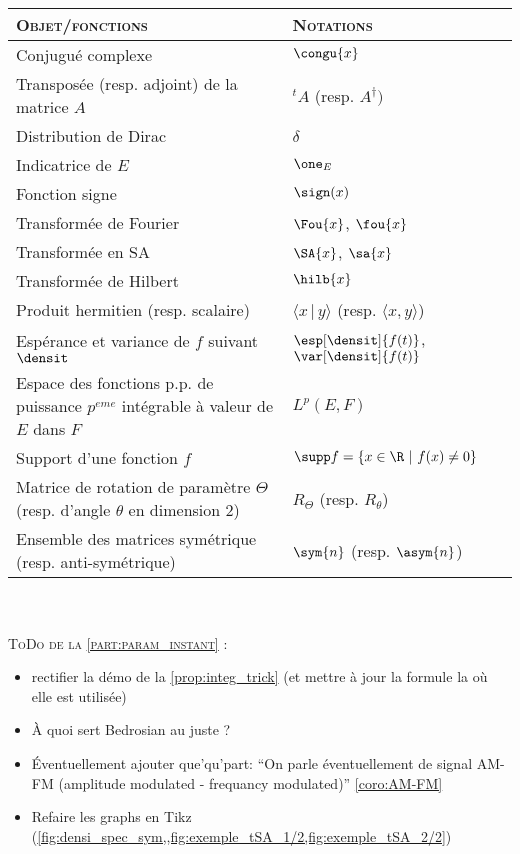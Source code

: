 \begin{tabular}{|| l | l ||} \hline
	\textsc{Objet/fonctions}  & \textsc{Notations} \\
	\hline\hline
	Conjugué complexe  					 &  $\congu{x}$ \\ \hline
	Transposée (resp. adjoint) de la matrice $A$ & $^tA$ (resp. $A^\dagger)$ \\ \hline
	Distribution de Dirac   &  $\delta$\\ \hline 
	Indicatrice de $E$   	 &  $\one_E$ \\ \hline 
	Fonction signe   		    &  $\sign(x)$ \\ \hline
	Transformée de Fourier   						&  $\Fou{x}$, $\fou{x}$ \\ \hline
	Transformée en SA   		  &  $\SA{x}$, $\sa{x}$ \\ \hline
	Transformée de Hilbert   	&  $\hilb{x}$ \\ \hline
	Produit hermitien (resp. scalaire)   &  $\langle x \,|\, y\rangle$ (resp. $\langle x,y\rangle$) \\ \hline
	Espérance et variance de $f$ suivant $\densit$   &  $\esp[\densit]{f(t)}$, $\var[\densit]{f(t)}$ \\  \hline
	Espace des fonctions p.p. de puissance $p^{eme}$ intégrable à valeur de $E$ dans $F$  &  $L^p(E, F)$ \\  \hline		
	Support d'une fonction $f$   &  $\supp f =\{x\in\R\ |\ f(x)\neq0\}$ \\  \hline
	Matrice de rotation de paramètre $\Theta$ (resp. d'angle $\theta$ en dimension 2)  &  $R_\Theta$ (resp. $R_\theta$)  \\  \hline
	Ensemble des matrices symétrique (resp. anti-symétrique)  &  $\sym{n}$ (resp. $\asym{n}$) \\  \hline	
\end{tabular}
\\ \\

\textsc{ToDo de  la \cref{part:param_instant} :}
\begin{itemize}	
	
	\item rectifier la démo de la \cref{prop:integ_trick} (et mettre à jour la formule la où elle est utilisée)
	
	
	\item \`A quoi sert Bedrosian au juste ? 
	
	\item \'Eventuellement ajouter que'qu'part: ``On parle éventuellement de signal AM-FM (amplitude modulated - frequancy modulated)'' \cref{coro:AM-FM}
	
	\item Refaire les graphs en Tikz (\cref{fig:densi_spec_sym,,fig:exemple_tSA_1/2,fig:exemple_tSA_2/2})
	
\end{itemize}




